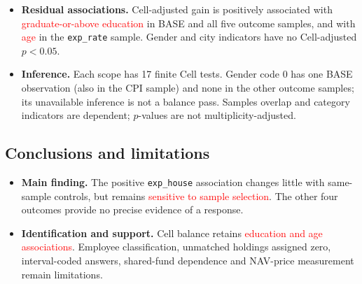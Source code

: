 \documentclass[11pt,letterpaper,english,final]{article}
\begin{document}
\begin{itemize}
\item \textbf{Residual associations.} Cell-adjusted gain is positively associated with \textcolor{red}{graduate-or-above education} in BASE and all five outcome samples, and with \textcolor{red}{age} in the \texttt{exp\_rate} sample. Gender and city indicators have no Cell-adjusted $p<0.05$.
\item \textbf{Inference.} Each scope has 17 finite Cell tests. Gender code 0 has one BASE observation (also in the CPI sample) and none in the other outcome samples; its unavailable inference is not a balance pass. Samples overlap and category indicators are dependent; $p$-values are not multiplicity-adjusted.
\end{itemize}

\subsection{Conclusions and limitations}
\begin{itemize}
\item \textbf{Main finding.} The positive \texttt{exp\_house} association changes little with same-sample controls, but remains \textcolor{red}{sensitive to sample selection}. The other four outcomes provide no precise evidence of a response.
\item \textbf{Identification and support.} Cell balance retains \textcolor{red}{education and age associations}. Employee classification, unmatched holdings assigned zero, interval-coded answers, shared-fund dependence and NAV-price measurement remain limitations. 
\end{itemize}
\end{document}
